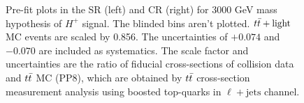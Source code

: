 \begin{figure}[H]
  \centering
  \caption{Pre-fit plots in the SR (left) and CR (right) for 3000 GeV mass hypothesis of $H^{+}$ signal. The blinded bins aren't plotted. $t\Bar{t}+\text{light}$ MC events are scaled by 0.856. The uncertainties of $+0.074$ and $-0.070$ are included as systematics. The scale factor and uncertainties are the ratio of fiducial cross-sections of collision data and $t\Bar{t}$ MC (PP8), which are obtained by $t\Bar{t}$ cross-section measurement analysis using boosted top-quarks in $\ell+\text{jets}$ channel.}
  \label{fig:Prefit_Hp3000_Blind_with_ttlight_constrained}
\end{figure}
